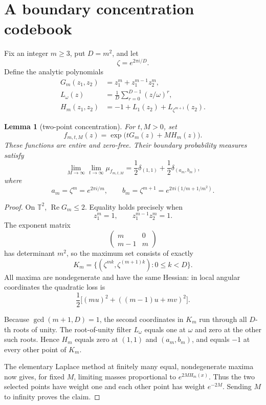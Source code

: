 \documentclass[11pt]{article}
\newtheorem{lemma}[theorem]{Lemma}
\newcommand{\T}{\mathbb T}
\begin{document}
\section{A boundary concentration codebook}

Fix an integer \(m\ge3\), put \(D=m^2\), and let
\[
 \zeta=e^{2\pi i/D}.
\]
Define the analytic polynomials
\begin{align}
 G_m(z_1,z_2)&=z_1^m+z_1^{m-1}z_2^m,\label{eq:G}\\
 L_\omega(z)&=\frac1D\sum_{r=0}^{D-1}(z/\omega)^r,\\
 H_m(z_1,z_2)&=-1+L_1(z_2)+L_{\zeta^{m+1}}(z_2).\label{eq:H}
\end{align}

\begin{lemma}[two-point concentration]\label{lem:concentration}
For \(t,M>0\), set
\[
 f_{m,t,M}(z)=\exp\bigl(tG_m(z)+MH_m(z)\bigr).
\]
These functions are entire and zero-free. Their boundary probability
measures satisfy
\[
 \lim_{M\to\infty}\lim_{t\to\infty}\mu_{f_{m,t,M}}
 =
 \frac12\delta_{(1,1)}
 +\frac12\delta_{(a_m,b_m)},
\]
where
\[
 a_m=\zeta^m=e^{2\pi i/m},
 \qquad
 b_m=\zeta^{m+1}=e^{2\pi i(1/m+1/m^2)}.
\]
\end{lemma}

\begin{proof}
On \(\T^2\), \(\operatorname{Re}G_m\le2\). Equality holds precisely when
\[
 z_1^m=1,
 \qquad
 z_1^{m-1}z_2^m=1.
\]
The exponent matrix
\[
 \begin{pmatrix}m&0\\m-1&m\end{pmatrix}
\]
has determinant \(m^2\), so the maximum set consists of exactly
\[
 K_m=\bigl\{(\zeta^{mk},\zeta^{(m+1)k}):0\le k<D\bigr\}.
\]
All maxima are nondegenerate and have the same Hessian: in local angular
coordinates the quadratic loss is
\[
 \frac12\bigl[(m u)^2+((m-1)u+mv)^2\bigr].
\]

Because \(\gcd(m+1,D)=1\), the second coordinates in \(K_m\) run through all
\(D\)-th roots of unity. The root-of-unity filter \(L_\omega\) equals one
at \(\omega\) and zero at the other such roots. Hence \(H_m\) equals zero
at \((1,1)\) and \((a_m,b_m)\), and equals \(-1\) at every other point of
\(K_m\).

The elementary Laplace method at finitely many equal, nondegenerate maxima
now gives, for fixed \(M\), limiting masses proportional to
\(e^{2M H_m(x)}\). Thus the two selected points have weight one and each
other point has weight \(e^{-2M}\). Sending \(M\) to infinity proves the
claim.
\end{proof}
\end{document}
